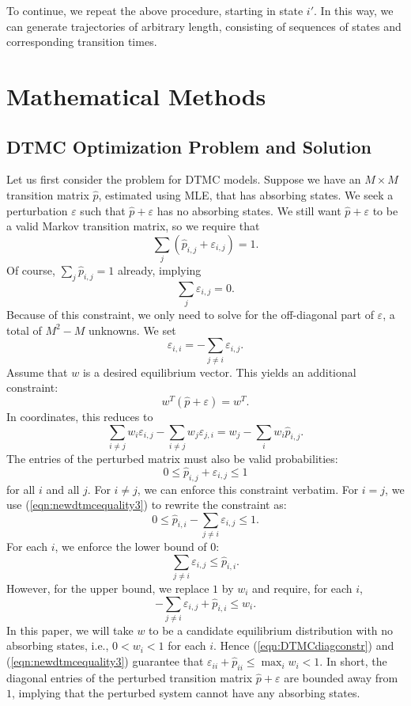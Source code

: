 \documentclass[review,letterpaper,11pt]{elsarticle}
\begin{document}
To continue, we repeat the above procedure, starting in state $i'$.  In this way, we can generate trajectories of arbitrary length, consisting of sequences of states and corresponding transition times.

\section{Mathematical Methods}
\label{sect:method}

\subsection{DTMC Optimization Problem and Solution} 
Let us first consider the problem for DTMC models.  Suppose we have an $M \times M$ transition matrix $\widehat{p}$, estimated using MLE, that has absorbing states.  We seek a perturbation $\varepsilon$ such that $\widehat{p} + \varepsilon$ has no absorbing states.  We still want $\widehat{p} + \varepsilon$ to be a valid Markov transition matrix, so we require that
\begin{equation}
\label{eqn:newdtmcequality1}
\sum_{j} ( \widehat{p}_{i,j}+\varepsilon_{i,j} )= 1.
\end{equation}
Of course, $\sum_j \widehat{p}_{i,j} = 1$ already, implying
\begin{equation}
\label{eqn:newdtmcequality2}
\sum_{j} \varepsilon_{i,j} = 0.
\end{equation}
Because of this constraint, we only need to solve for the off-diagonal part of $\varepsilon$, a total of $M^2 - M$ unknowns.  We set
\begin{equation}
\label{eqn:newdtmcequality3}
\varepsilon_{i,i} = -\sum_{j \neq i} \varepsilon_{i,j}.
\end{equation}
Assume that $w$ is a desired equilibrium vector.  This yields an additional constraint:
$$
w^T (\widehat{p} + \varepsilon) = w^T.
$$
In coordinates, this reduces to
$$
\sum_{i \neq j} w_i \varepsilon_{i,j} - \sum_{i \neq j} w_j \varepsilon_{j,i} = w_j - \sum_i w_i \widehat{p}_{i,j}.
$$
The entries of the perturbed matrix must also be valid probabilities:
$$
0 \leq \widehat{p}_{i,j} + \varepsilon_{i,j} \leq 1
$$
for all $i$ and all $j$.  For $i \neq j$, we can enforce this constraint verbatim.  For $i = j$, we use (\ref{eqn:newdtmcequality3}) to rewrite the constraint as:
$$
0 \leq \widehat{p}_{i,i} - \sum_{j \neq i} \varepsilon_{i,j} \leq 1.
$$
For each $i$, we enforce the lower bound of $0$:
$$
\sum_{j \neq i} \varepsilon_{i,j} \leq \widehat{p}_{i,i}.
$$
However, for the upper bound, we replace $1$ by $w_i$ and require, for each $i$,
\begin{equation}
\label{eqn:DTMCdiagconstr}
-\sum_{j \neq i} \varepsilon_{i,j} + \widehat{p}_{i,i} \leq w_i.
\end{equation}
In this paper, we will take $w$ to be a candidate equilibrium distribution with no absorbing states, i.e., $0 < w_i < 1$ for each $i$.  Hence (\ref{eqn:DTMCdiagconstr}) and (\ref{eqn:newdtmcequality3}) guarantee that $\varepsilon_{ii} + \widehat{p}_{ii} \leq \max_i w_i < 1$.  In short, the diagonal entries of the perturbed transition matrix $\widehat{p} + \varepsilon$ are bounded away from $1$, implying that the perturbed system cannot have any absorbing states.
\end{document}
